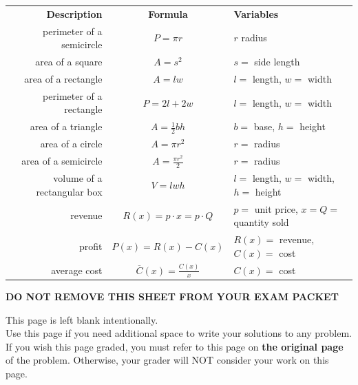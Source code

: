 \documentclass[11pt]{article}
\begin{document}
\begin{enumerate}
\begin{center}
    \begin{tabular}{ r | c | l }
    {\bf Description} & {\bf Formula} & {\bf Variables}\\
    perimeter of a semicircle & $P = \pi r$ & $r$ radius\\
    \hline
    area of a square & $A=s^2$ & $s=$ side length\\
    \hline
    area of a rectangle & $A=lw$ & $l=$ length, $w=$ width\\
    \hline
    perimeter of a rectangle & $P=2l + 2w$ & $l=$ length, $w=$ width\\
    \hline
    area of a triangle & $A=\frac12bh$ & $b=$ base, $h=$ height\\
    \hline
    area of a circle & $A=\pi r^2$ & $r=$ radius\\
    \hline
    area of a semicircle & $A=\frac{\pi r^2}{2}$ & $r=$ radius\\
    \hline
    volume of a rectangular box & $V=lwh$ & $l=$ length, $w=$ width, $h=$ height\\
    \hline
    revenue & $R(x) = p\cdot x = p\cdot Q$ & $p=$ unit price, $x=Q=$ quantity sold\\
    \hline
    profit & $P(x) = R(x) - C(x)$ & $R(x)=$ revenue, $C(x)=$ cost\\
    \hline
    average cost & $\overline C(x) = \frac{C(x)}{x}$ & $C(x)=$ cost\\
    \end{tabular}
\end{center}

\begin{center}
{\bf DO NOT REMOVE THIS SHEET FROM YOUR EXAM PACKET}
\end{center}

\newpage

This page is left blank intentionally.\\

Use this page if you need additional space to write your solutions to any problem. \\

If you wish this page graded, you must refer to this page on \textbf{the original page} of the problem. Otherwise, your grader will NOT consider your work on this page.

\end{enumerate}
\end{document}
